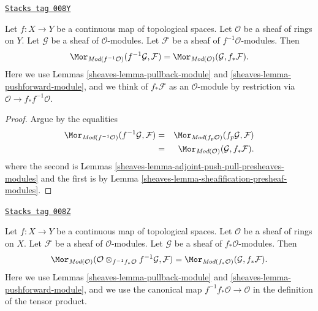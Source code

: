 \begin{lemma}
\label{sheaves-lemma-adjoint-push-pull-modules}
\href{https://stacks.math.columbia.edu/tag/008Y}{\texttt{Stacks tag 008Y}}

Let $f : X \to Y$ be a continuous map of topological spaces.
Let $\mathcal{O}$ be a sheaf of rings on $Y$.
Let $\mathcal{G}$ be a sheaf of $\mathcal{O}$-modules.
Let $\mathcal{F}$ be a sheaf of $f^{-1}\mathcal{O}$-modules.
Then
$$
\Mor_{\textit{Mod}(f^{-1}\mathcal{O})}(f^{-1}\mathcal{G}, \mathcal{F})
=
\Mor_{\textit{Mod}(\mathcal{O})}(\mathcal{G}, f_*\mathcal{F}).
$$
Here we use
Lemmas \ref{sheaves-lemma-pullback-module}
and \ref{sheaves-lemma-pushforward-module}, and we think of
$f_*\mathcal{F}$ as an $\mathcal{O}$-module by restriction via
$\mathcal{O} \to f_*f^{-1}\mathcal{O}$.
\end{lemma}

\begin{proof}

Argue by the equalities
\begin{eqnarray*}
\Mor_{\textit{Mod}(f^{-1}\mathcal{O})}(f^{-1}\mathcal{G}, \mathcal{F})
& = &
\Mor_{\textit{Mod}(f_p\mathcal{O})}(f_p\mathcal{G}, \mathcal{F}) \\
& = &
\Mor_{\textit{Mod}(\mathcal{O})}(\mathcal{G}, f_*\mathcal{F}).
\end{eqnarray*}
where the second is
Lemmas \ref{sheaves-lemma-adjoint-push-pull-presheaves-modules}
and the first is by Lemma \ref{sheaves-lemma-sheafification-presheaf-modules}.
\end{proof}

\begin{lemma}
\label{sheaves-lemma-adjoint-pull-push-modules}
\href{https://stacks.math.columbia.edu/tag/008Z}{\texttt{Stacks tag 008Z}}

Let $f : X \to Y$ be a continuous map of topological spaces.
Let $\mathcal{O}$ be a sheaf of rings on $X$.
Let $\mathcal{F}$ be a sheaf of $\mathcal{O}$-modules.
Let $\mathcal{G}$ be a sheaf of $f_*\mathcal{O}$-modules.
Then
$$
\Mor_{\textit{Mod}(\mathcal{O})}(
\mathcal{O} \otimes_{f^{-1}f_*\mathcal{O}} f^{-1}\mathcal{G}, \mathcal{F})
=
\Mor_{\textit{Mod}(f_*\mathcal{O})}(\mathcal{G}, f_*\mathcal{F}).
$$
Here we use
Lemmas \ref{sheaves-lemma-pullback-module}
and \ref{sheaves-lemma-pushforward-module}, and we use
the canonical map $f^{-1}f_*\mathcal{O} \to \mathcal{O}$
in the definition of the tensor product.
\end{lemma}

